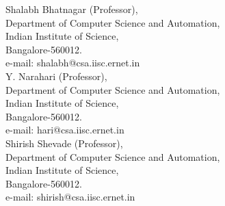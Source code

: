 \documentclass[line,margin]{res}
\begin{document}
\begin{resume}
Shalabh Bhatnagar (Professor),\\
Department of Computer Science and Automation,\\
Indian Institute of Science,\\
Bangalore-560012.\\
e-mail: shalabh@csa.iisc.ernet.in\\

Y. Narahari (Professor),\\
Department of Computer Science and Automation,\\
Indian Institute of Science,\\
Bangalore-560012.\\
e-mail: hari@csa.iisc.ernet.in\\


Shirish Shevade (Professor),\\
Department of Computer Science and Automation,\\
Indian Institute of Science,\\
Bangalore-560012.\\
e-mail: shirish@csa.iisc.ernet.in\\


\end{resume}
\end{document}
